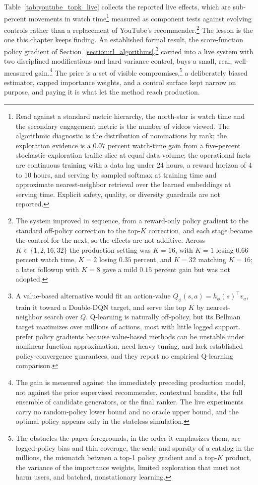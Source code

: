 Table~\ref{tab:youtube_topk_live} collects the reported live effects, which are sub-percent movements in watch time\footnote{Read against a standard metric hierarchy, the north-star is watch time and the secondary engagement metric is the number of videos viewed. The algorithmic diagnostic is the distribution of nominations by rank; the exploration evidence is a $0.07$ percent watch-time gain from a five-percent stochastic-exploration traffic slice at equal data volume; the operational facts are continuous training with a data lag under 24 hours, a reward horizon of 4 to 10 hours, and serving by sampled softmax at training time and approximate nearest-neighbor retrieval over the learned embeddings at serving time. Explicit safety, quality, or diversity guardrails are not reported.} measured as component tests against evolving controls rather than a replacement of YouTube's recommender.\footnote{The system improved in sequence, from a reward-only policy gradient to the standard off-policy correction to the top-$K$ correction, and each stage became the control for the next, so the effects are not additive. Across $K \in \{1, 2, 16, 32\}$ the production setting was $K = 16$, with $K = 1$ losing $0.66$ percent watch time, $K = 2$ losing $0.35$ percent, and $K = 32$ matching $K = 16$; a later followup with $K = 8$ gave a mild $0.15$ percent gain but was not adopted.} The lesson is the one this chapter keeps finding. An established formal result, the score-function policy gradient of Section~\ref{section:rl_algorithms},\footnote{A value-based alternative would fit an action-value $Q_\phi(s,a) = h_\phi(s)^\top v_a$, train it toward a Double-DQN target, and serve the top $K$ by nearest-neighbor search over $Q$. Q-learning is naturally off-policy, but its Bellman target maximizes over millions of actions, most with little logged support. \citet{Chen2019YouTubeTopK} prefer policy gradients because value-based methods can be unstable under nonlinear function approximation, need heavy tuning, and lack established policy-convergence guarantees, and they report no empirical Q-learning comparison.} carried into a live system with two disciplined modifications and hard variance control, buys a small, real, well-measured gain.\footnote{The gain is measured against the immediately preceding production model, not against the prior supervised recommender, contextual bandits, the full ensemble of candidate generators, or the final ranker. The live experiments carry no random-policy lower bound and no oracle upper bound, and the optimal policy appears only in the stateless simulation.} The price is a set of visible compromises,\footnote{The obstacles the paper foregrounds, in the order it emphasizes them, are logged-policy bias and thin coverage, the scale and sparsity of a catalog in the millions, the mismatch between a top-1 policy gradient and a top-$K$ product, the variance of the importance weights, limited exploration that must not harm users, and batched, nonstationary learning.} a deliberately biased estimator, capped importance weights, and a control surface kept narrow on purpose, and paying it is what let the method reach production.

